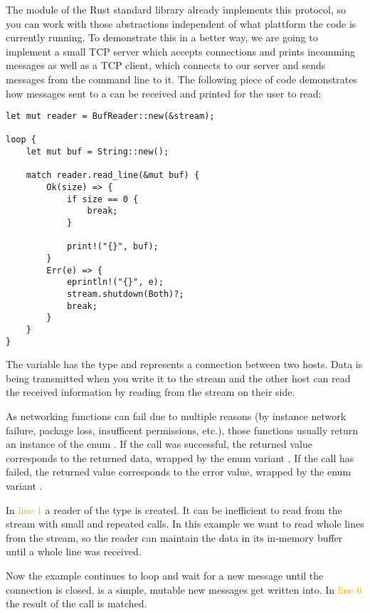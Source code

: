 The module  of the Rust standard library already implements this protocol, so you can work with those
abstractions independent of what plattform the code is currently running. To demonstrate this in a better way, we are
going to implement a small TCP server which accepts connections and prints incomming messages as well as a TCP client,
which connects to our server and sends messages from the command line to it. The following piece of code demonstrates
how messages sent to a  can be received and printed for the user to read:

\begin{verbatim}
let mut reader = BufReader::new(&stream);

loop {
    let mut buf = String::new();

    match reader.read_line(&mut buf) {
        Ok(size) => {
            if size == 0 {
                break;
            }

            print!("{}", buf);
        }
        Err(e) => {
            eprintln!("{}", e);
            stream.shutdown(Both)?;
            break;
        }
    }
}
\end{verbatim}

The variable  has the type  and represents a connection between two hosts. Data is being
transmitted when you write it to the stream and the other host can read the received information by reading from the
stream on their side.

As networking functions can fail due to multiple reasons (by instance network failure, package loss, insufficent
permissions, etc.), those functions usually return an instance of the enum . If the call was
successful, the returned value corresponds to the returned data, wrapped by the enum variant . If the call
has failed, the returned value corresponds to the error value, wrapped by the enum variant .

In \textcolor{orange}{line 1} a reader of the type  is created. It can be inefficient to read
from the stream with small and repeated calls. In this example we want to read whole lines from the stream, so the
reader can maintain the data in its in-memory buffer until a whole line was received.

Now the example continues to loop and wait for a new message until the connection is closed.  is a simple,
mutable  new messages get written into. In \textcolor{orange}{line 6} the result of the call
 is matched.

